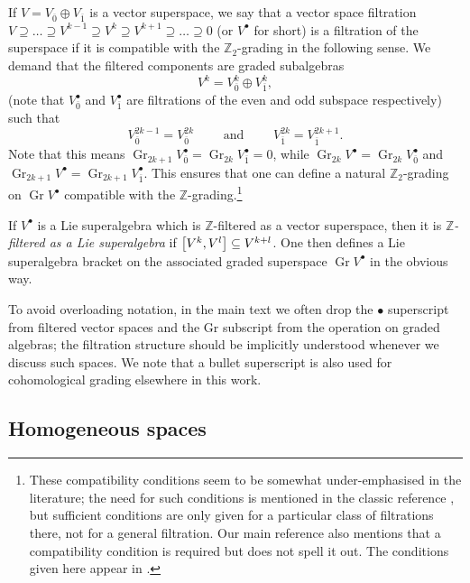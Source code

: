 \documentclass[11pt]{article}
\numberwithin{equation}{section}
\numberwithin{equation}{section}
\newcommand{\ZZ}{\mathbb{Z}}
\newcommand{\1}{\mathbbm{1}}
\DeclareMathOperator{\Gr}{Gr}
\begin{document}
If $V=V_{\overline{0}}\oplus V_{\overline{1}}$ is a vector superspace, we say that a vector space filtration $V \supseteq \dots \supseteq V^{k-1} \supseteq V^k \supseteq V^{k+1} \supseteq \dots \supseteq 0$ (or $V^\bullet$ for short) is a filtration of the superspace if it is compatible with the $\ZZ_2$-grading in the following sense. We demand that the filtered components are graded subalgebras
\begin{equation}\label{eq:filter-super-1}
	V^k = V^k_{\overline{0}} \oplus V^k_{\overline{1}},
\end{equation}
(note that $V^\bullet_{\overline{0}}$ and $V^\bullet_{\overline{1}}$ are filtrations of the even and odd subspace respectively) such that
\begin{equation}\label{eq:filter-super-2}
	V^{2k-1}_{\overline{0}} = V^{2k}_{\overline{0}}
	\qquad	\text{ and } \qquad
	V^{2k}_{\overline{1}} = V^{2k+1}_{\overline{1}}.
\end{equation}
Note that this means $\Gr_{2k+1}V^\bullet_{\overline 0}=\Gr_{2k}V^\bullet_{\overline 1}=0$, while $\Gr_{2k} V^\bullet=\Gr_{2k} V^\bullet_{\overline0}$ and $\Gr_{2k+1} V^\bullet = \Gr_{2k+1} V^\bullet_{\overline 1}$. This ensures that one can define a natural $\ZZ_2$-grading on $\Gr V^\bullet$ compatible with the $\ZZ$-grading.\footnote{These compatibility conditions seem to be somewhat under-emphasised in the literature; the need for such conditions is mentioned in the classic reference \cite{Kac1977}, but sufficient conditions are only given for a particular class of filtrations there, not for a general filtration. Our main reference \cite{Cheng1998} also mentions that a compatibility condition is required but does not spell it out. The conditions given here appear in \cite{Scheunert1979}.}

If $V^\bullet$ is a Lie superalgebra which is $\ZZ$-filtered as a vector superspace, then it is \emph{$\ZZ$-filtered as a Lie superalgebra} if $\comm{V^k}{V^l}\subseteq V^{k+l}$. One then defines a Lie superalgebra bracket on the associated graded superspace $\Gr V^\bullet$ in the obvious way.

To avoid overloading notation, in the main text we often drop the $\bullet$ superscript from filtered vector spaces and the $\mathrm{Gr}$ subscript from the operation on graded algebras; the filtration structure should be implicitly understood whenever we discuss such spaces. We note that a bullet superscript is also used for cohomological grading elsewhere in this work.
	
\subsection{Homogeneous spaces}
\label{sec:homog-spaces}
\end{document}
